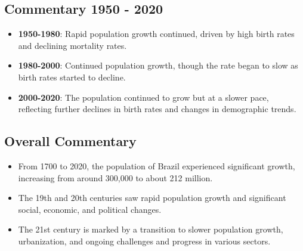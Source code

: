 \subsection*{Commentary 1950 - 2020}
\begin{itemize}
    \item \textbf{1950-1980}: Rapid population growth continued, driven by high birth rates and declining mortality rates.
    \item \textbf{1980-2000}: Continued population growth, though the rate began to slow as birth rates started to decline.
    \item \textbf{2000-2020}: The population continued to grow but at a slower pace, reflecting further declines in birth rates and changes in demographic trends.
\end{itemize}

\subsection*{Overall Commentary}
\begin{itemize}
    \item From 1700 to 2020, the population of Brazil experienced significant growth, increasing from around 300,000 to about 212 million.
    \item The 19th and 20th centuries saw rapid population growth and significant social, economic, and political changes.
    \item The 21st century is marked by a transition to slower population growth, urbanization, and ongoing challenges and progress in various sectors.
\end{itemize}
